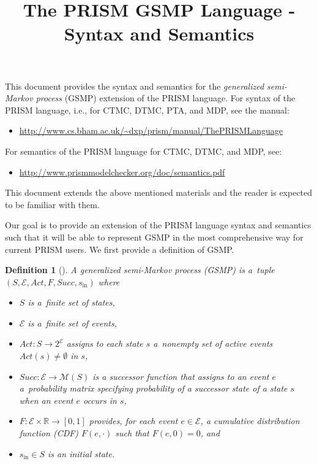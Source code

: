 \documentclass{article}
\title{The PRISM GSMP Language - Syntax and Semantics}
\newtheorem{definition}[theorem]{Definition}
\newcommand{\Rset}{\mathbb{R}}
\newcommand{\calM}{\mathcal{M}}
\newcommand{\calG}{\mathcal{G}}
\newcommand{\calE}{\mathcal{E}}
\renewcommand{\_}{\underline{~}}
\newcommand{\events}{{\calE}}
\newcommand{\suc}{Succ}
\newcommand{\initstate}{s_\mathrm{in}}
\newcommand{\act}{Act}
\newcommand{\transmats}{\calM}
\begin{document}
\maketitle

\noindent
This document provides the syntax and semantics for the \emph{generalized semi-Markov process} (GSMP) extension of the PRISM language.
For syntax of the PRISM language, i.e., for CTMC, DTMC, PTA, and MDP, see the manual:
\begin{itemize}
	\item \url{http://www.cs.bham.ac.uk/~dxp/prism/manual/ThePRISMLanguage}
\end{itemize}
For semantics of the PRISM language for CTMC, DTMC, and MDP, see:
\begin{itemize}
	\item \url{http://www.prismmodelchecker.org/doc/semantics.pdf}
\end{itemize}
This document extends the above mentioned materials and the reader is expected to be familiar with them.

Our goal is to provide an extension of the PRISM language syntax and semantics such that it will be able to represent GSMP in the most comprehensive way for current PRISM users. 
We first provide a definition of GSMP.
\begin{definition}[\cite{Haas:book}] 
	A generalized semi-Markov process (GSMP) is a~tuple $%
	(S,\events,\act,F,\suc,\initstate)$ where
	\begin{itemize}
		\item $S$ is a~finite set of states,
		\item $\events$ is a~finite set of \emph{events},
		\item $\act \colon S \rightarrow 2^{\events}$ assigns to each state $s$ a~nonempty set of active events $\act(s) \not = \emptyset$ in $s$,
		\item $\suc : \events \rightarrow \transmats(S)$ is a \emph{successor function} that assigns to an event $e$ a~probability matrix %
		specifying probability of a successor state of a state $s$ when an event $e$ occurs in $s$,	
		\item $F\colon \events \times \Rset \rightarrow [0,1]$ provides, for each event $e \in \events$, a cumulative distribution function (CDF) $F(e,\cdot)$ such that $F(e,0)=0$, and 
		\item $\initstate \in S$ is an \emph{initial state}.
	\end{itemize}
\end{definition}
\end{document}
